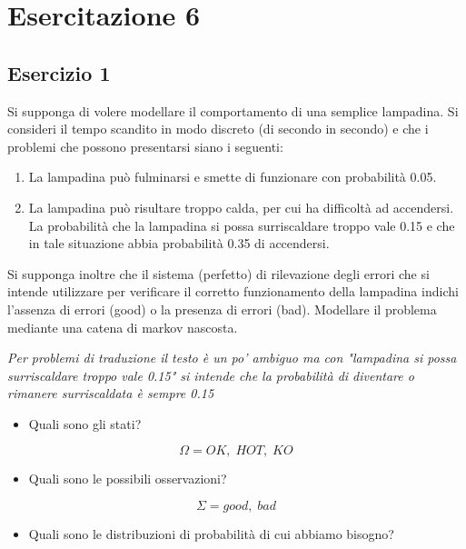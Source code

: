 \documentclass{article}
\begin{document}
	\section{Esercitazione 6}
	\subsection{Esercizio 1}
	
	Si supponga di volere modellare il comportamento di una semplice lampadina. Si consideri il tempo scandito in
	modo discreto (di secondo in secondo) e che i problemi che possono presentarsi siano i seguenti:
	
	\begin{enumerate}
		\item La lampadina può fulminarsi e smette di funzionare con probabilità 0.05.
		\item La lampadina può risultare troppo calda, per cui ha difficoltà ad accendersi. La probabilità che la lampadina si
		possa surriscaldare troppo vale 0.15 e che in tale situazione abbia probabilità 0.35 di accendersi.
	\end{enumerate}
Si supponga inoltre che il sistema (perfetto) di rilevazione degli errori che si intende utilizzare per verificare il corretto
funzionamento della lampadina indichi l’assenza di errori (good) o la presenza di errori (bad).
Modellare il problema mediante una catena di markov nascosta.

\textit{Per problemi di traduzione il testo è un po' ambiguo ma con "lampadina si
	possa surriscaldare troppo vale 0.15" si intende che la probabilità di diventare o rimanere surriscaldata è sempre 0.15 }

\begin{itemize}
\item	Quali sono gli stati?
\end{itemize}

\[ \Omega = { OK, \; HOT,  \; KO  }\]

\begin{itemize}
		\item Quali sono le possibili osservazioni?
\end{itemize}

\[
	\Sigma = { good, \; bad}
\]

\begin{itemize}
	\item Quali sono le distribuzioni di probabilità di cui abbiamo bisogno?
\end{itemize}
\end{document}
